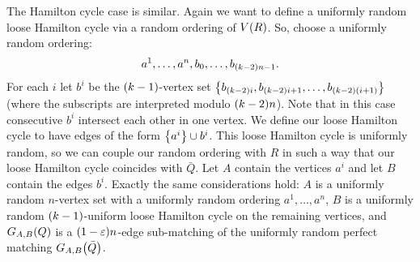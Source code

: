 \documentclass[11pt,english]{article}
\theoremstyle{plain}
\theoremstyle{definition}
\theoremstyle{definition}
\theoremstyle{plain}
\theoremstyle{plain}
\theoremstyle{plain}
\theoremstyle{plain}
\theoremstyle{remark}
\theoremstyle{remark}
\let\originalleft\left
\let\originalright\right
\renewcommand{\left}{\mathopen{}\mathclose\bgroup\originalleft}
\renewcommand{\right}{\aftergroup\egroup\originalright}
\begin{document}
The Hamilton cycle case is similar. Again we want to define a uniformly random loose Hamilton cycle via a random ordering of $V\left(R\right)$. So, choose a uniformly random ordering:
\[
a^{1},\dots,a^{n},b_{0},\dots,b_{\left(k-2\right)n-1}.
\]
For each $i$ let $b^{i}$ be the $\left(k-1\right)$-vertex set $\left\{ b_{\left(k-2\right)i},b_{\left(k-2\right)i+1},\dots,b_{\left(k-2\right)\left(i+1\right)}\right\}$ (where the subscripts are interpreted modulo $\left(k-2\right)n$). Note that in this case consecutive $b^i$ intersect each other in one vertex. We define our loose Hamilton cycle to have edges of the form $\left\{ a^{i}\right\} \cup b^{i}$. This loose Hamilton cycle is uniformly random, so we can couple our random ordering with $R$ in such a way that our loose Hamilton cycle coincides with $\bar Q$. Let $A$ contain
the vertices $a^{i}$ and let $B$ contain the
edges $b^{i}$. Exactly the same considerations hold: $A$ is a uniformly
random $n$-vertex set with a uniformly random ordering $a^{1},\dots,a^{n}$, $B$ is a uniformly random $\left(k-1\right)$-uniform loose Hamilton
cycle on the remaining vertices, and $G_{A,B}\left(Q\right)$ is a
$\left(1-\varepsilon\right)n$-edge sub-matching of the uniformly random perfect
matching $G_{A,B}\left(\bar{Q}\right)$.
\end{document}
